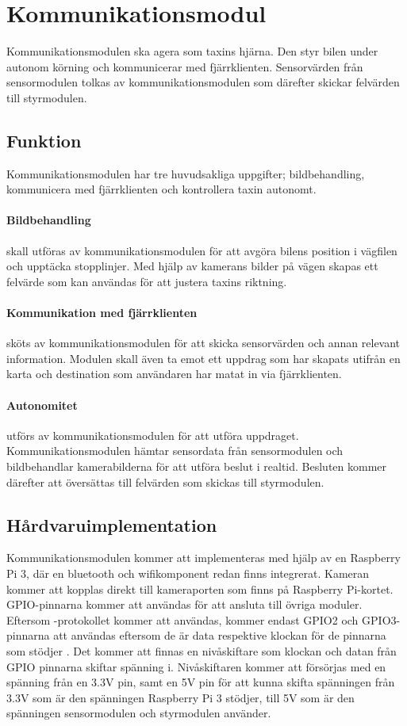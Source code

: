 \documentclass[designspec/spec.tex]{subfiles}
\begin{document}
\section{Kommunikationsmodul}
Kommunikationsmodulen ska agera som taxins hjärna. Den styr bilen under autonom
körning och kommunicerar med fjärrklienten. Sensorvärden från sensormodulen
tolkas av kommunikationsmodulen som därefter skickar felvärden till
styrmodulen.

\subsection{Funktion}
Kommunikationsmodulen har tre huvudsakliga uppgifter; bildbehandling,
kommunicera med fjärrklienten och kontrollera taxin autonomt.

\paragraph{Bildbehandling} skall utföras av kommunikationsmodulen för att
avgöra bilens position i vägfilen och upptäcka stopplinjer. Med hjälp av
kamerans bilder på vägen skapas ett felvärde som kan användas för att justera
taxins riktning.

\paragraph{Kommunikation med fjärrklienten} sköts av kommunikationsmodulen för
att skicka sensorvärden och annan relevant information. Modulen skall även ta
emot ett uppdrag som har skapats utifrån en karta och destination som
användaren har matat in via fjärrklienten.

\paragraph{Autonomitet} utförs av kommunikationsmodulen för att utföra
uppdraget. Kommunikationsmodulen hämtar sensordata från sensormodulen och
bildbehandlar kamerabilderna för att utföra beslut i realtid. Besluten kommer
därefter att översättas till felvärden som skickas till styrmodulen.

\subsection{Hårdvaruimplementation} 
Kommunikationsmodulen kommer att implementeras med hjälp av en Raspberry Pi 3,
där en bluetooth och wifikomponent redan finns integrerat. Kameran kommer att
kopplas direkt till kameraporten som finns på Raspberry Pi-kortet.
GPIO-pinnarna  kommer att användas för att ansluta till övriga moduler.
Eftersom {\iic}-protokollet kommer att användas, kommer endast GPIO2 och
GPIO3-pinnarna att användas eftersom de är data respektive klockan för de
pinnarna som stödjer {\iic}. Det kommer att finnas en nivåskiftare som klockan
och datan från GPIO pinnarna skiftar spänning i. Nivåskiftaren kommer att
försörjas med en spänning från en 3.3V pin, samt en 5V pin för att kunna skifta
spänningen från 3.3V som är den spänningen Raspberry Pi 3 stödjer, till 5V som
är den spänningen sensormodulen och styrmodulen använder.
\end{document}
